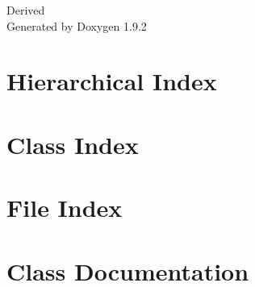 \documentclass[twoside]{book}
\newcommand{\+}{\discretionary{\mbox{\scriptsize$\hookleftarrow$}}{}{}}
\newcommand{\clearemptydoublepage}{%
    \newpage{\pagestyle{empty}\cleardoublepage}%
  }
\begin{document}
  \raggedbottom
  \begin{titlepage}
  \vspace*{7cm}
  \begin{center}%
  {\Large Derived}\\
  \vspace*{1cm}
  {\large Generated by Doxygen 1.9.2}\\
  \end{center}
  \end{titlepage}
  \clearemptydoublepage
  \tableofcontents
  \clearemptydoublepage
\chapter{Hierarchical Index}

\chapter{Class Index}

\chapter{File Index}

\chapter{Class Documentation}





















































\end{document}
